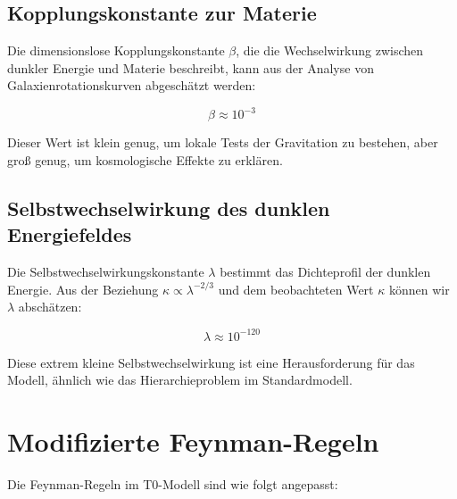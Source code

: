 \documentclass[a4paper,12pt]{article}
\theoremstyle{definition}
\theoremstyle{remark}
\begin{document}
	\subsection{Kopplungskonstante zur Materie}
	
	Die dimensionslose Kopplungskonstante $\beta$, die die Wechselwirkung zwischen dunkler Energie und Materie beschreibt, kann aus der Analyse von Galaxienrotationskurven abgeschätzt werden:
	
	\begin{equation}
		\beta \approx 10^{-3}
	\end{equation}
	
	Dieser Wert ist klein genug, um lokale Tests der Gravitation zu bestehen, aber groß genug, um kosmologische Effekte zu erklären.
	
	\subsection{Selbstwechselwirkung des dunklen Energiefeldes}
	
	Die Selbstwechselwirkungskonstante $\lambda$ bestimmt das Dichteprofil der dunklen Energie. Aus der Beziehung $\kappa \propto \lambda^{-2/3}$ und dem beobachteten Wert $\kappa$ können wir $\lambda$ abschätzen:
	
	\begin{equation}
		\lambda \approx 10^{-120}
	\end{equation}
	
	Diese extrem kleine Selbstwechselwirkung ist eine Herausforderung für das Modell, ähnlich wie das Hierarchieproblem im Standardmodell.
	
	\section{Modifizierte Feynman-Regeln}
	
	Die Feynman-Regeln im T0-Modell sind wie folgt angepasst:
	
\end{document}
